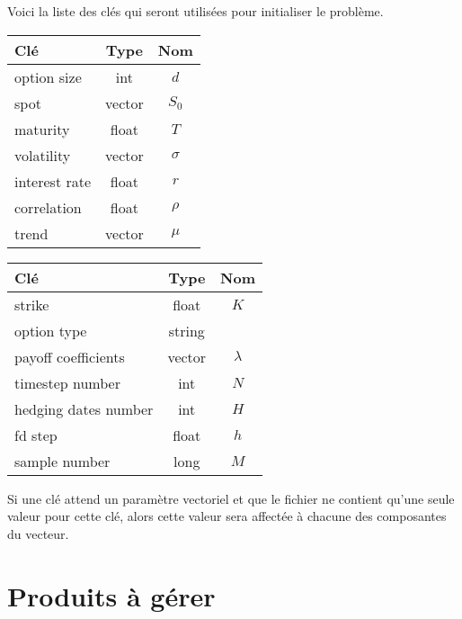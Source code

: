 \documentclass[a4paper,11pt]{article}
\begin{document}
Voici la liste des clés qui seront utilisées pour initialiser le problème.
\begin{multicols}{2}
\begin{center}
  \begin{tabular}{l@{$\quad$}|@{$\quad$}c|@{$\quad$}c}
    Clé & Type & Nom\\
    \hline
    option size & int & $d$ \\
    spot & vector & $S_0$\\
    maturity & float & $T$\\
    volatility & vector & $\sigma$\\
    interest rate & float & $r$ \\
    correlation & float & $\rho$\\
    trend & vector & $\mu$ \\
  \end{tabular}

  \begin{tabular}{l@{$\quad$}|@{$\quad$}c|@{$\quad$}c}
    Clé & Type & Nom\\
    \hline
    strike & float & $K$\\
    option type & string & \\
    payoff coefficients & vector &$\lambda$ \\
    timestep number & int &$N$ \\
    hedging dates number & int &$H$ \\
    fd step & float &$h$ \\
    sample number & long  & $M$
  \end{tabular}
\end{center}
\end{multicols}
Si une clé attend un paramètre vectoriel et que le fichier ne contient qu'une seule valeur pour cette clé, alors cette valeur sera affectée à chacune des composantes du vecteur.


\section{Produits à gérer}
\label{sec:options}
\end{document}

